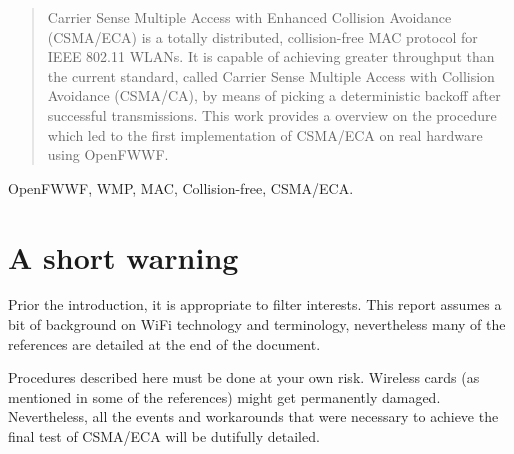 \documentclass[conference]{IEEEtran}
\begin{document}
\begin{abstract}

\boldmath Carrier Sense Multiple Access with Enhanced Collision Avoidance (CSMA/ECA) is a totally distributed, collision-free MAC protocol for IEEE 802.11 WLANs. It is capable of achieving greater throughput than the current standard, called Carrier Sense Multiple Access with Collision Avoidance (CSMA/CA), by means of picking a deterministic backoff after successful transmissions. This work provides a overview on the procedure which led to the first implementation of CSMA/ECA on real hardware using OpenFWWF.


\end{abstract}

\begin{IEEEkeywords}
OpenFWWF, WMP, MAC, Collision-free, CSMA/ECA.
\end{IEEEkeywords}

\section*{A short warning} \label{warning}
Prior the introduction, it is appropriate to filter interests. This report assumes a bit of background on WiFi technology and terminology, nevertheless many of the references are detailed at the end of the document.

Procedures described here must be done at your own risk. Wireless cards (as mentioned in some of the references) might get permanently damaged. Nevertheless, all the events and workarounds that were necessary to achieve the final test of CSMA/ECA will be dutifully detailed.
\end{document}

